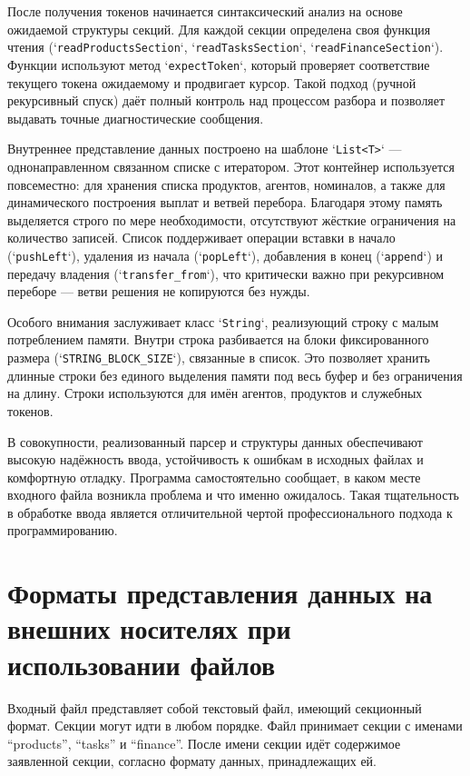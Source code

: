 \documentclass[12pt]{extarticle}
\begin{document}
После получения токенов начинается синтаксический анализ на основе ожидаемой структуры секций. Для каждой секции определена своя функция чтения (`\texttt{readProductsSection}`, `\texttt{readTasksSection}`, `\texttt{readFinanceSection}`). Функции используют метод `\texttt{expectToken}`, который проверяет соответствие текущего токена ожидаемому и продвигает курсор. Такой подход (ручной рекурсивный спуск) даёт полный контроль над процессом разбора и позволяет выдавать точные диагностические сообщения.

Внутреннее представление данных построено на шаблоне `\texttt{List<T>}` — однонаправленном связанном списке с итератором. Этот контейнер используется повсеместно: для хранения списка продуктов, агентов, номиналов, а также для динамического построения выплат и ветвей перебора. Благодаря этому память выделяется строго по мере необходимости, отсутствуют жёсткие ограничения на количество записей. Список поддерживает операции вставки в начало (`\texttt{pushLeft}`), удаления из начала (`\texttt{popLeft}`), добавления в конец (`\texttt{append}`) и передачу владения (`\texttt{transfer\_from}`), что критически важно при рекурсивном переборе — ветви решения не копируются без нужды.

Особого внимания заслуживает класс `\texttt{String}`, реализующий строку с малым потреблением памяти. Внутри строка разбивается на блоки фиксированного размера (`\texttt{STRING\_BLOCK\_SIZE}`), связанные в список. Это позволяет хранить длинные строки без единого выделения памяти под весь буфер и без ограничения на длину. Строки используются для имён агентов, продуктов и служебных токенов.

В совокупности, реализованный парсер и структуры данных обеспечивают высокую надёжность ввода, устойчивость к ошибкам в исходных файлах и комфортную отладку. Программа самостоятельно сообщает, в каком месте входного файла возникла проблема и что именно ожидалось. Такая тщательность в обработке ввода является отличительной чертой профессионального подхода к программированию.

\section{Форматы представления данных на внешних носителях при использовании файлов}

Входный файл представляет собой текстовый файл, имеющий секционный формат. Секции могут идти в любом порядке. Файл принимает секции с именами ``products'', ``tasks'' и ``finance''. После имени секции идёт содержимое заявленной секции, согласно формату данных, принадлежащих ей.
\end{document}
